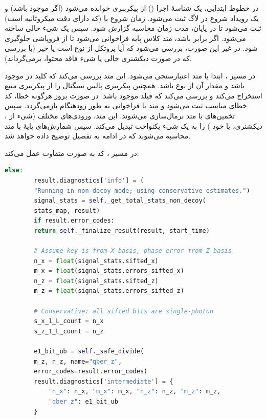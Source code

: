 در خطوط ابتدایی، یک شناسۀ اجرا () از پیکرببری خوانده می‌شود (اگر موجود باشد) و یک رویداد شروع در لاگ ثبت می‌شود. زمان شروع با  (که دارای دقت میکروثانیه است) ثبت می‌شود تا در پایان، مدت زمان محاسبه گزارش شود. سپس یک شیء  خالی ساخته می‌شود. اگر  برابر  باشد، متد کلاس پایه فراخوانی می‌شود تا از فروپاشی جلوگیری شود. در غیر این صورت، بررسی می‌شود که آیا پروتکل از نوع  است یا خیر (با بررسی  که در صورت دیکشنری خالی یا شیء فاقد محتوا،  برمی‌گرداند).

در مسیر ، ابتدا  با متد  اعتبارسنجی می‌شود. این متد بررسی می‌کند که کلید  در  موجود باشد و مقدار آن از نوع  باشد. همچنین پیکرببری پالس سیگنال را از پیکرببری منبع استخراج می‌کند و بررسی می‌کند که فیلد  موجود باشد. در صورت بروز هرگونه خطا، کد خطای مناسب ثبت می‌شود و متد با فراخوانی  به طور زودهنگام بازمی‌گردد. سپس تخمین‌های  با متد  نرمال‌سازی می‌شوند. این متد، ورودی‌های مختلف (شیء  از ، دیکشنری، یا خود ) را به یک شیء یکنواخت  تبدیل می‌کند. سپس شمارش‌های پایۀ  با متد  محاسبه می‌شوند که در ادامه به تفصیل توضیح داده خواهد شد.

در مسیر ، کد به صورت متفاوت عمل می‌کند:

\begin{LTR}
	\begin{lstlisting}[language=Python]
		else:
		result.diagnostics['info'] = (
		"Running in non-decoy mode; using conservative estimates.")
		signal_stats = self._get_total_stats_non_decoy(
		stats_map, result)
		if result.error_codes:
		return self._finalize_result(result, start_time)
		
		# Assume key is from X-basis, phase error from Z-basis
		n_x = float(signal_stats.sifted_x)
		m_x = float(signal_stats.errors_sifted_x)
		n_z = float(signal_stats.sifted_z)
		m_z = float(signal_stats.errors_sifted_z)
		
		# Conservative: all sifted bits are single-photon
		s_x_1_L_count = n_x
		s_z_1_L_count = n_z
		
		e1_bit_ub = self._safe_divide(
		m_z, n_z, name="qber_z",
		error_codes=result.error_codes)
		result.diagnostics['intermediate'] = {
			"n_x": n_x, "m_x": m_x, "n_z": n_z, "m_z": m_z,
			"qber_z": e1_bit_ub
		}
	\end{lstlisting}
\end{LTR}

